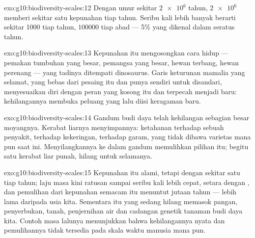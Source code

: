 \begin{solution}{exo:g10:biodiversity-scales:12}
Dengan umur sekitar $\num{2e6}$ tahun, $\num{2e6}$  memberi
sekitar satu kepunahan tiap tahun. Seribu kali lebih banyak berarti
sekitar 1000  tiap tahun, $\num{100000}$ tiap abad --- 5\%
 yang dikenal dalam seratus tahun.
\end{solution}

\begin{solution}{exo:g10:biodiversity-scales:13}
Kepunahan itu mengosongkan cara hidup --- pemakan tumbuhan yang besar,
pemangsa yang besar, hewan terbang, hewan perenang --- yang tadinya
ditempati dinosaurus. Garis keturunan mamalia yang selamat, yang bebas
dari pesaing itu dan punya  sendiri untuk
disandari, menyesuaikan diri dengan peran yang kosong itu dan terpecah
menjadi  baru: kehilangannya membuka peluang yang lalu diisi
keragaman baru.
\end{solution}

\begin{solution}{exo:g10:biodiversity-scales:14}
Gandum budi daya telah kehilangan sebagian besar  moyangnya.
Kerabat liarnya menyimpannya:  ketahanan terhadap sebuah penyakit,
terhadap kekeringan, terhadap garam, yang tidak dibawa varietas mana
pun saat ini. Menyilangkannya ke dalam gandum memulihkan pilihan itu;
begitu satu kerabat liar punah,  hilang untuk selamanya.
\end{solution}

\begin{solution}{exo:g10:biodiversity-scales:15}
Kepunahan itu alami, tetapi dengan sekitar satu  tiap tahun;
laju masa kini ratusan sampai seribu kali lebih cepat, setara dengan
, dan pemulihan dari kepunahan semacam itu menuntut
jutaan tahun --- lebih lama daripada usia  kita. Sementara itu
 yang sedang hilang memasok pangan, penyerbukan, tanah,
penjernihan air dan cadangan genetik tanaman budi daya kita. Contoh
masa lalunya menunjukkan bahwa kehilangannya nyata dan pemulihannya
tidak tersedia pada skala waktu manusia mana pun.
\end{solution}

